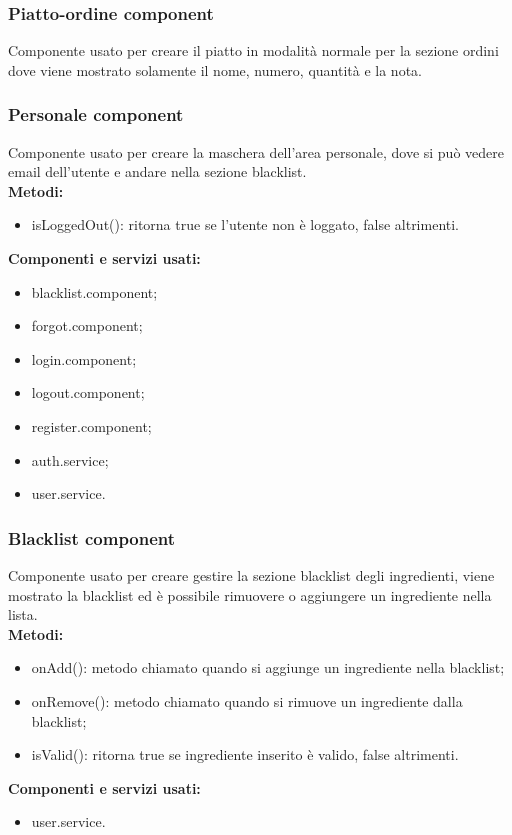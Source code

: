\subsubsection{Piatto-ordine component}
Componente usato per creare il piatto in modalità normale per la sezione ordini dove viene mostrato solamente il nome, numero, quantità e la nota.\\

\subsubsection{Personale component}
Componente usato per creare la maschera dell'area personale, dove si può vedere email dell'utente e andare nella sezione blacklist.\\
\textbf{Metodi:}
\begin{itemize}
    \item isLoggedOut(): ritorna true se l'utente non è loggato, false altrimenti.
\end{itemize}
\textbf{Componenti e servizi usati:}
\begin{itemize}
    \item blacklist.component;
    \item forgot.component;
    \item login.component;
    \item logout.component;
    \item register.component;
    \item auth.service;
    \item user.service.
\end{itemize}

\subsubsection{Blacklist component}
Componente usato per creare gestire la sezione blacklist degli ingredienti, viene mostrato la blacklist ed è possibile rimuovere o aggiungere un ingrediente nella lista.\\
\textbf{Metodi:}
\begin{itemize}
    \item onAdd(): metodo chiamato quando si aggiunge un ingrediente nella blacklist;
    \item onRemove(): metodo chiamato quando si rimuove un ingrediente dalla blacklist;
    \item isValid(): ritorna true se ingrediente inserito è valido, false altrimenti.
\end{itemize}
\textbf{Componenti e servizi usati:}
\begin{itemize}
    \item user.service.
\end{itemize}

